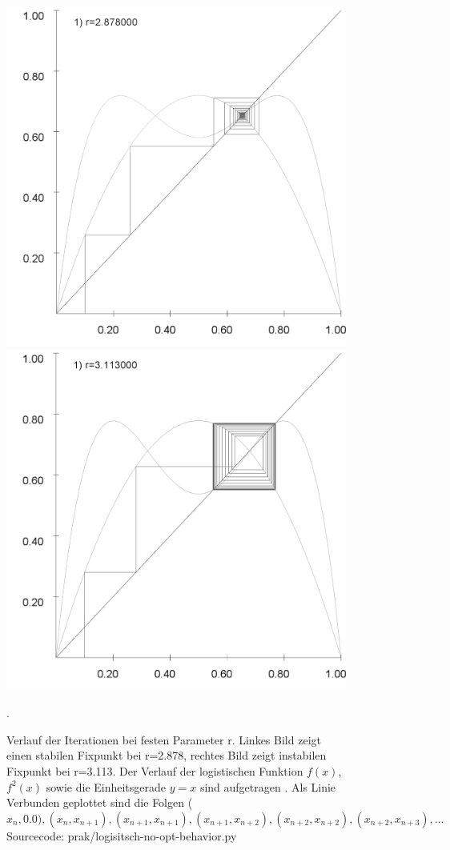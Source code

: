 \documentclass{scrartcl}
\begin{document}
\begin{figure}
\centering
\includegraphics[scale=0.2]{fixpunkt-2878}
\includegraphics[scale=0.2]{fixpunkt-311}
\caption{Verlauf der Iterationen bei festen Parameter r. Linkes Bild zeigt einen stabilen Fixpunkt bei r=2.878, rechtes Bild zeigt instabilen Fixpunkt bei r=3.113. Der Verlauf der logistischen Funktion $f(x)$, $f^2(x)$ sowie die Einheitsgerade $y=x$ sind aufgetragen . Als Linie Verbunden geplottet sind die Folgen ($x_n, 0.0), (x_n, x_{n+1}), (x_{n+1}, x_{n+1}), (x_{n+1}, x_{n+2}), (x_{n+2}, x_{n+2}), (x_{n+2}, x_{n+3}), ...$ Sourcecode: prak/logisitsch-no-opt-behavior.py}. 
\label{fig:log-iteration-behavior}
\end{figure}
\end{document}
